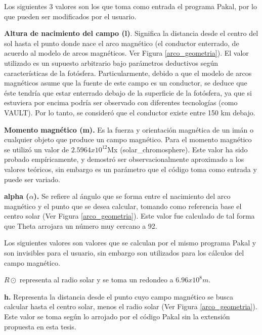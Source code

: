 Los siguientes 3 valores son los que toma como entrada el programa Pakal, por lo que pueden ser modificados por el usuario.

\textbf{Altura de nacimiento del campo (l)}. Significa la distancia desde el centro del sol hasta el punto donde nace el arco magn\'etico (el conductor enterrado, de acuerdo al modelo de arcos magn\'eticos. Ver Figura \ref{arco_geometria}). El valor utilizado es un supuesto arbitrario bajo par\'ametros deductivos seg\'un caracter\'isticas de la fot\'osfera. Particularmente, debido a que el modelo de arcos magn\'eticos asume que la fuente de este campo es un conductor, se deduce que \'este tendr\'ia que estar enterrado debajo de la superficie de la fot\'osfera, ya que si estuviera por encima podr\'ia ser observado con diferentes tecnolog\'ias (como VAULT). Por lo tanto, se consider\'o que el conductor existe entre 150 km debajo.

\textbf{Momento magn\'etico (m).} Es la fuerza y orientaci\'on magn\'etica de un im\'an o cualquier objeto que produce un campo magn\'etico. Para el momento magn\'etico se utiliz\'o un valor de $2.5964x10^{12}$Mx (solar\_chromosphere). Este valor ha sido probado emp\'iricamente, y demostr\'o ser observacionalmente aproximado a los valores te\'oricos, sin embargo es un par\'ametro que el c\'odigo toma como entrada y puede ser variado.

\textbf{alpha ($\alpha$).} Se refiere al \'angulo que se forma entre el nacimiento del arco magn\'etico y el punto que se desea calcular, tomando como referencia base el centro solar (Ver Figura \ref{arco_geometria}). Este valor fue calculado de tal forma que Theta arrojara un n\'umero muy cercano a 92\degree.

Los siguientes valores son valores que se calculan por el mismo programa Pakal y son invisibles para el usuario, sin embargo son utilizados para los c\'alculos del campo magn\'etico.


\textbf{\(R\odot\)}  representa al radio solar y se toma un redondeo a $6.96x10^8m$.

\textbf{h.} Representa la distancia desde el punto cuyo campo magn\'etico se busca calcular hasta el centro solar, menos el radio solar (Ver Figura \ref{arco_geometria}). Este valor se toma seg\'un lo arrojado por el c\'odigo Pakal sin la extensi\'on propuesta en esta tesis.

